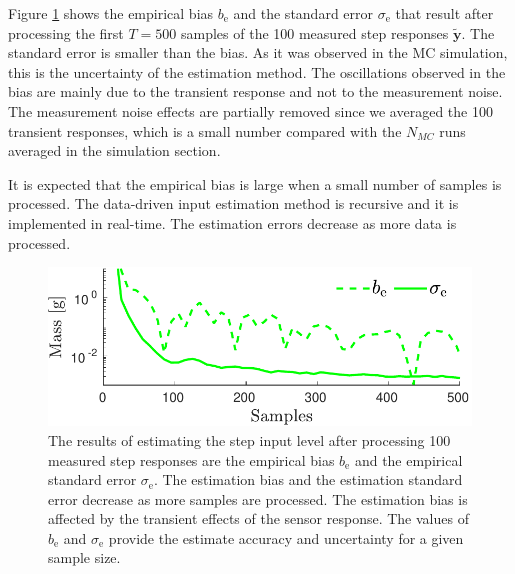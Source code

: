 Figure \ref{fig:b_sigma_exp_str} shows the empirical bias $b_{\mathrm{e}}$ and the standard error $\sigma_{\mathrm{e}}$ that result after processing the first $T=500$ samples of the 100 measured step responses $\widetilde{\mathbf{y}}$.
The standard error is smaller than the bias.
As it was observed in the MC simulation, this is the uncertainty of the estimation method.
The oscillations observed in the bias are mainly due to the transient response and not to the measurement noise.
The measurement noise effects are partially removed since we averaged the 100 transient responses, 
which is a small number compared with the $N_{MC}$ runs averaged in the simulation section. 

It is expected that the empirical bias is large when a small number of samples is processed. 
The data-driven input estimation method is recursive and it is implemented in real-time.
The estimation errors decrease as more data is processed.

\begin{figure}[!htb]
\centering
\includegraphics[width=1.0\columnwidth]{./ChapterExperimentalValidation/fig/Fig_8.pdf} 
\caption{ \label{fig:b_sigma_exp_str} 
The results of estimating the step input level after processing 100 measured step responses are the empirical bias $b_{\mathrm{e}}$ and the empirical standard error $\sigma_{\mathrm{e}}$. 
The estimation bias and the estimation standard error decrease as more samples are processed. 
The estimation bias is affected by the transient effects of the sensor response.  
The values of $b_{\mathrm{e}}$ and $\sigma_{\mathrm{e}}$ provide the estimate accuracy and uncertainty for a given sample size.
}
\end{figure}

